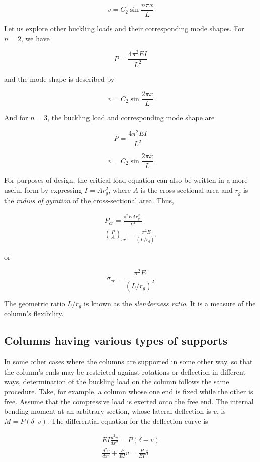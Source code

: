 \documentclass[a4paper,openany,12pt]{book}
\begin{document}
{{$$v = C_2\sin \frac{n\pi x}{L}$$

Let us explore other buckling loads and their corresponding mode shapes.
For \(n = 2\), we have

$$P = \frac{4 \pi^2 E I}{L^2}$$

and the mode shape is described by

$$v = C_2 \sin \frac{2 \pi x}{L}$$


And for \(n=3\), the buckling load and corresponding mode shape are

$$P = \frac{4 \pi^2 E I}{L^2}$$

$$v = C_2 \sin \frac{2 \pi x}{L}$$


For purposes of design, the critical load equation can also be written
in a more useful form by expressing \(I = Ar_g^2\), where \(A\) is the
cross-sectional area and \(r_g\) is the \emph{radius of gyration} of the
cross-sectional area. Thus,

$$\begin{gathered}
  P_{cr} = \frac{\pi^2EAr_g^2)}{L^2} \\ 
  \left( \frac{P}{A} \right)_{cr} = \frac{\pi ^2E}{(L/r_g)^2}\end{gathered}$$

or

$$\sigma_{cr} = \frac{\pi ^2E}{(L/r_g)^2}$$

The geometric ratio \(L/r_g\) is known as the \emph{slenderness ratio}. It is a
measure of the column's flexibility.

\subsection{Columns having various types of supports}
\label{columns-having-various-types-of-supports}
In some other cases where the columns are supported in some other way,
so that the column's ends may be restricted against rotations or
deflection in different ways, determination of the buckling load on the
column follows the same procedure. Take, for example, a column whose one
end is fixed while the other is free. Assume that the compressive load
is exerted onto the free end. The internal bending moment at an
arbitrary section, whose lateral deflection is \(v\), is
\(M = P(\delta – v)\). The differential equation for the deflection curve
is


$$\begin{gathered}
  EI\frac{d^2v}{dx^2} = P(\delta  - v) \\ 
  \frac{d^2v}{dx^2} + \frac{P}{EI}v = \frac{P}{EI}\delta  \\ \end{gathered}$$

}}
\end{document}
